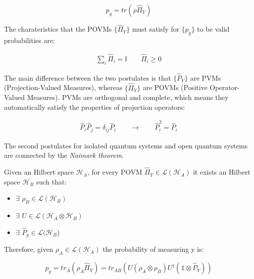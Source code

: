 \begin{enumerate}
    \begin{equation}
        p_y = tr(\rho \hat{\Pi}_Y)
    \end{equation}
 
    The charateristics that the POVMs $\{\hat{\Pi}_Y\}$ must satisfy for $\{p_y\}$ to be valid probabilities are:

    \begin{align}
        \sum_i \hat{\Pi}_i = \mathds{I}
        \qquad
        \hat{\Pi}_i \ge 0
    \end{align}

\end{enumerate}

The main difference between the two postulates is that $\{\hat{P}_Y\}$ are PVMs (Projection-Valued Measures), whereas $\{\hat{\Pi}_Y\}$ are POVMs
(Positive Operator-Valued Measures).
PVMs are orthogonal and complete, which means they automatically satisfy the properties of projection operators:

\begin{align}
    \hat{P}_i \hat{P}_j = \delta_{ij} \hat{P}_i
    \qquad
    \rightarrow
    \qquad
    \hat{P}_i^2 = \hat{P}_i
\end{align}

The second postulates for isolated quantum systems and open quantum systems are connected by the \textit{Naimark theorem}.

\begin{theorem}
    Given an Hilbert space $\mathcal{H}_A$, for every POVM $\hat{\Pi}_Y \in \mathcal{L}(\mathcal{H}_A)$ it exists an 
    Hilbert space $\mathcal{H}_B$ such that:
    \begin{itemize}
        \item $\exists$ $\rho_B \in \mathcal{L}(\mathcal{H}_B)$
        \item $\exists$ $U \in \mathcal{L}(\mathcal{H}_A \otimes \mathcal{H}_B)$
        \item $\exists$ $\hat{P}_y \in \mathcal{L}(\mathcal{H}_B$)
    \end{itemize}
    Therefore, given $\rho_A \in \mathcal{L}(\mathcal{H}_A)$ the probability of measuring y is:

    \begin{equation}
        p_y = tr_A(\rho_A \hat{\Pi}_Y) = tr_{AB}(U (\rho_A \otimes \rho_B) U^{\dagger}(\mathds{1} \otimes \hat{P}_Y))
    \end{equation}
\end{theorem}

